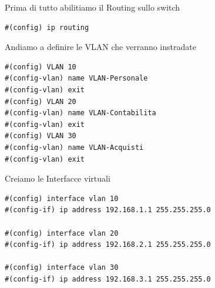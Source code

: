 \documentclass[12pt]{article}
\begin{document}
        \begin{center}
            Prima di tutto abilitiamo il Routing sullo switch
            \begin{tcolorbox}[title=Multilayer Switch, colframe=gray!50!gray, colback=white!50!white]
                \begin{lstlisting}
#(config) ip routing
                \end{lstlisting}
            \end{tcolorbox}
            Andiamo a definire le VLAN che verranno instradate 
            \begin{tcolorbox}[title=Multilayer Switch, colframe=gray!50!gray, colback=white!50!white]
                \begin{lstlisting}
#(config) VLAN 10
#(config-vlan) name VLAN-Personale
#(config-vlan) exit
#(config) VLAN 20
#(config-vlan) name VLAN-Contabilita
#(config-vlan) exit
#(config) VLAN 30
#(config-vlan) name VLAN-Acquisti
#(config-vlan) exit
                \end{lstlisting}
            \end{tcolorbox}
            Creiamo le Interfacce virtuali
            \begin{tcolorbox}[title=Multilayer Switch, colframe=gray!50!gray, colback=white!50!white]
                \begin{lstlisting}
#(config) interface vlan 10
#(config-if) ip address 192.168.1.1 255.255.255.0

#(config) interface vlan 20
#(config-if) ip address 192.168.2.1 255.255.255.0

#(config) interface vlan 30
#(config-if) ip address 192.168.3.1 255.255.255.0
                \end{lstlisting} 
            \end{tcolorbox}


\end{center}
\end{document}

